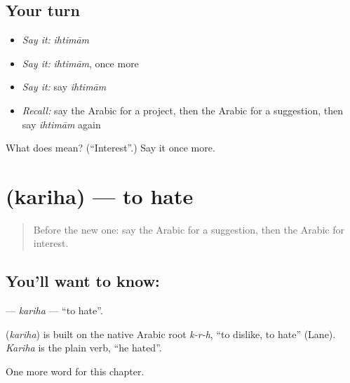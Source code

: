 \subsection*{Your turn}
\begin{itemize}
\raggedright
  \item \emph{Say it:} \emph{ihtimām}
  \item \emph{Say it:} \emph{ihtimām}, once more
  \item \emph{Say it:} say \emph{ihtimām}
  \item \emph{Recall:} say the Arabic for a project, then the Arabic for a suggestion, then say \emph{ihtimām} again
\end{itemize}

\begin{tcolorbox}[breakable,colback=teal!4,colframe=teal!35!black,title={Before you move on}]
What does  mean? (\textquotedblleft{}Interest\textquotedblright{}.) Say it once more.
\end{tcolorbox}
\section[\texorpdfstring{\ar{كره} (kariha)}{كره (kariha)}]{ (kariha) — to hate}

\label{lesson:AR-C113-kariha}



\begin{quote}
Before the new one: say the Arabic for a suggestion, then the Arabic for interest.
\end{quote}

\subsection*{You'll want to know: }
\textbf{} — \emph{kariha} — \textquotedblleft{}to hate\textquotedblright{}.

\begin{cousinweb}
\textbf{} (\emph{kariha}) is built on the native Arabic root \emph{k-r-h}, \textquotedblleft{}to dislike, to hate\textquotedblright{} (Lane). \emph{Kariha} is the plain verb, \textquotedblleft{}he hated\textquotedblright{}.
\end{cousinweb}

\begin{grammarlens}[title={What you've built}]
One more word for this chapter.
\end{grammarlens}

